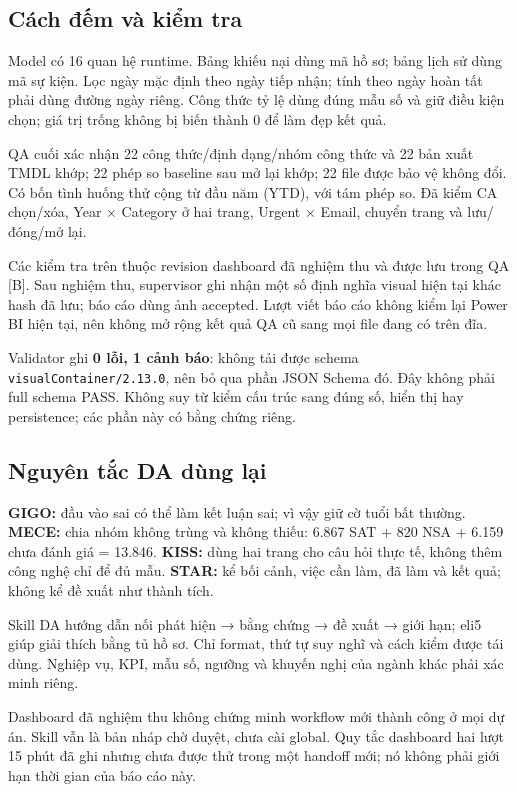 \documentclass[11pt,a4paper]{article}
\begin{document}
\subsection*{Cách đếm và kiểm tra}
Model có 16 quan hệ runtime. Bảng khiếu nại dùng mã hồ sơ; bảng lịch sử dùng mã sự kiện. Lọc ngày mặc định theo ngày tiếp nhận; tính theo ngày hoàn tất phải dùng đường ngày riêng. Công thức tỷ lệ dùng đúng mẫu số và giữ điều kiện chọn; giá trị trống không bị biến thành 0 để làm đẹp kết quả.

QA cuối xác nhận 22 công thức/định dạng/nhóm công thức và 22 bản xuất TMDL khớp; 22 phép so baseline sau mở lại khớp; 22 file được bảo vệ không đổi. Có bốn tình huống thử cộng từ đầu năm (YTD), với tám phép so. Đã kiểm CA chọn/xóa, Year × Category ở hai trang, Urgent × Email, chuyển trang và lưu/đóng/mở lại.

Các kiểm tra trên thuộc revision dashboard đã nghiệm thu và được lưu trong QA [B]. Sau nghiệm thu, supervisor ghi nhận một số định nghĩa visual hiện tại khác hash đã lưu; báo cáo dùng ảnh accepted. Lượt viết báo cáo không kiểm lại Power BI hiện tại, nên không mở rộng kết quả QA cũ sang mọi file đang có trên đĩa.

Validator ghi \textbf{0 lỗi, 1 cảnh báo}: không tải được schema \texttt{visualContainer/2.13.0}, nên bỏ qua phần JSON Schema đó. Đây không phải full schema PASS. Không suy từ kiểm cấu trúc sang đúng số, hiển thị hay persistence; các phần này có bằng chứng riêng.

\subsection*{Nguyên tắc DA dùng lại}
\textbf{GIGO:} đầu vào sai có thể làm kết luận sai; vì vậy giữ cờ tuổi bất thường. \textbf{MECE:} chia nhóm không trùng và không thiếu: 6.867 SAT + 820 NSA + 6.159 chưa đánh giá = 13.846. \textbf{KISS:} dùng hai trang cho câu hỏi thực tế, không thêm công nghệ chỉ để đủ mẫu. \textbf{STAR:} kể bối cảnh, việc cần làm, đã làm và kết quả; không kể đề xuất như thành tích.

Skill DA hướng dẫn nối phát hiện → bằng chứng → đề xuất → giới hạn; eli5 giúp giải thích bằng tủ hồ sơ. Chỉ format, thứ tự suy nghĩ và cách kiểm được tái dùng. Nghiệp vụ, KPI, mẫu số, ngưỡng và khuyến nghị của ngành khác phải xác minh riêng.

Dashboard đã nghiệm thu không chứng minh workflow mới thành công ở mọi dự án. Skill vẫn là bản nháp chờ duyệt, chưa cài global. Quy tắc dashboard hai lượt 15 phút đã ghi nhưng chưa được thử trong một handoff mới; nó không phải giới hạn thời gian của báo cáo này.
\clearpage
\end{document}
